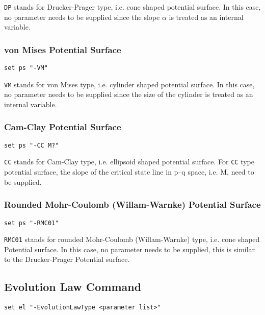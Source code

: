 \texttt{DP}  stands  for  Drucker-Prager type, i.e. cone shaped
potential  surface.  In  this  case,  no  parameter needs to be
supplied  since  the  slope  $\alpha$ is treated as an internal
variable.

\subsubsection{von Mises Potential Surface} 
\label{vm_ps}
\begin{verbatim}
set ps "-VM"
\end{verbatim}

\texttt{VM}  stands  for  von  Mises type, i.e. cylinder shaped
potential  surface.  In  this  case,  no  parameter needs to be
supplied  since  the  size  of  the  cylinder  is treated as an
internal variable.

\subsubsection{Cam-Clay Potential Surface} 
\label{cc_ps}
\begin{verbatim}
set ps "-CC M?"
\end{verbatim}

\texttt{CC}  stands  for  Cam-Clay  type, i.e. ellipsoid shaped
potential  surface. For \texttt{CC} type potential surface, the
slope of the critical state line in p--q space, i.e. M, need to
be supplied.

\subsubsection{Rounded Mohr-Coulomb (Willam-Warnke) Potential Surface} 
\label{rmc01_ps}
\begin{verbatim}
set ps "-RMC01"
\end{verbatim}

\texttt{RMC01} stands for rounded Mohr-Coulomb (Willam-Warnke) type, 
i.e. cone shaped
Potential  surface. In this case, no parameter needs to be supplied, 
this is similar to the Drucker-Prager Potential surface.


\subsection{Evolution Law Command}
\label{EL_Command}

\begin{verbatim}
set el "-EvolutionLawType <parameter list>"
\end{verbatim}

